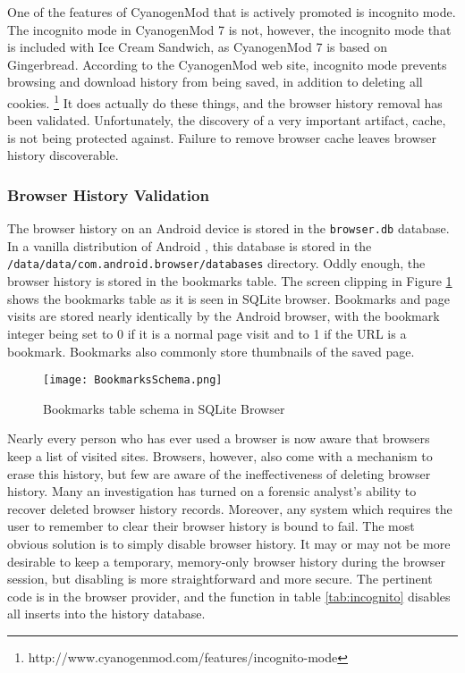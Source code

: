 One of the features of CyanogenMod that is actively promoted is incognito mode. The incognito mode in CyanogenMod 7 is not, however,
the incognito mode that is included with Ice Cream Sandwich, as CyanogenMod 7 is based on Gingerbread. According to the CyanogenMod
web site, incognito mode prevents browsing and download history from being saved, in addition to deleting all cookies.
\footnote{http://www.cyanogenmod.com/features/incognito-mode} It does actually do these things, and the browser history removal has
been validated.  Unfortunately, the discovery of a very important artifact, cache, is not being protected against. Failure to remove
browser cache leaves browser history discoverable.

\subsubsection{Browser History Validation}

The browser history on an Android device is stored in the \texttt{browser.db} database.  In a vanilla distribution of Android , this
database is stored in the \texttt{/data/data/com.android.browser/databases} directory.  Oddly enough, the browser history is stored
in the bookmarks table.  The screen clipping in Figure \ref{fig:bookmarkschema} shows the bookmarks table as it is seen in SQLite
browser.  Bookmarks and page visits are stored nearly identically by the Android browser, with the bookmark integer being set to 0
if it is a normal page visit and to 1 if the URL is a bookmark.  Bookmarks also commonly store thumbnails of the saved page.
\begin{figure}[htb]
\texttt{[image: BookmarksSchema.png]}
\caption{Bookmarks table schema in SQLite Browser}
\label{fig:bookmarkschema}
\end{figure}

Nearly every person who has ever used a browser is now aware that browsers keep a list of visited sites.  Browsers, however, also
come with a mechanism to erase this history, but few are aware of the ineffectiveness of deleting browser history.  Many an
investigation has turned on a forensic analyst's ability to recover deleted browser history records.  Moreover, any system which
requires the user to remember to clear their browser history is bound to fail.  The most obvious solution is to simply disable
browser history.  It may or may not be more desirable to keep a temporary, memory-only browser history during the browser
session, but disabling is more straightforward and more secure.  The pertinent code is in the browser provider, and the function in
table \ref{tab:incognito} disables all inserts into the history database.

